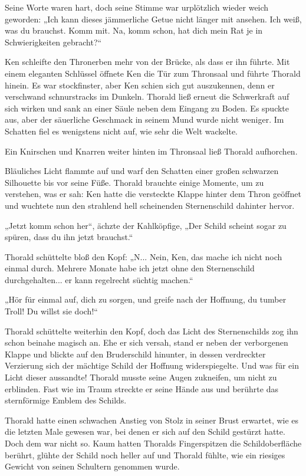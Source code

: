 Seine Worte waren hart, doch seine Stimme war urplötzlich wieder weich geworden: „Ich kann dieses jämmerliche Getue nicht länger mit ansehen. Ich weiß, was du brauchst. Komm mit. Na, komm schon, hat dich mein Rat je in Schwierigkeiten gebracht?“

Ken schleifte den Thronerben mehr von der Brücke, als dass er ihn führte. Mit einem eleganten Schlüssel öffnete Ken die Tür zum Thronsaal und führte Thorald hinein. Es war stockfinster, aber Ken schien sich gut auszukennen, denn er verschwand schnurstracks im Dunkeln. Thorald ließ erneut die Schwerkraft auf sich wirken und sank an einer Säule neben dem Eingang zu Boden. Es spuckte aus, aber der säuerliche Geschmack in seinem Mund wurde nicht weniger. Im Schatten fiel es wenigstens nicht auf, wie sehr die Welt wackelte.

Ein Knirschen und Knarren weiter hinten im Thronsaal ließ Thorald aufhorchen.

Bläuliches Licht flammte auf und warf den Schatten einer großen schwarzen Silhouette bis vor seine Füße. Thorald brauchte einige Momente, um zu verstehen, was er sah: Ken hatte die versteckte Klappe hinter dem Thron geöffnet und wuchtete nun den strahlend hell scheinenden Sternenschild dahinter hervor.

„Jetzt komm schon her“, ächzte der Kahlköpfige, „Der Schild scheint sogar zu spüren, dass du ihn jetzt brauchst.“

Thorald schüttelte bloß den Kopf: „N... Nein, Ken, das mache ich nicht noch einmal durch. Mehrere Monate habe ich jetzt ohne den Sternenschild durchgehalten... er kann regelrecht süchtig machen.“

„Hör für einmal auf, dich zu sorgen, und greife nach der Hoffnung, du tumber Troll! Du willst sie doch!“

Thorald schüttelte weiterhin den Kopf, doch das Licht des Sternenschilds zog ihn schon beinahe magisch an. Ehe er sich versah, stand er neben der verborgenen Klappe und blickte auf den Bruderschild hinunter, in dessen verdreckter Verzierung sich der mächtige Schild der Hoffnung widerspiegelte. Und was für ein Licht dieser aussandte! Thorald musste seine Augen zukneifen, um nicht zu erblinden. Fast wie im Traum streckte er seine Hände aus und berührte das sternförmige Emblem des Schilds.

Thorald hatte einen schwachen Anstieg von Stolz in seiner Brust erwartet, wie es die letzten Male gewesen war, bei denen er sich auf den Schild gestürzt hatte. Doch dem war nicht so. Kaum hatten Thoralds Fingerspitzen die Schildoberfläche berührt, glühte der Schild noch heller auf und Thorald fühlte, wie ein riesiges Gewicht von seinen Schultern genommen wurde.

